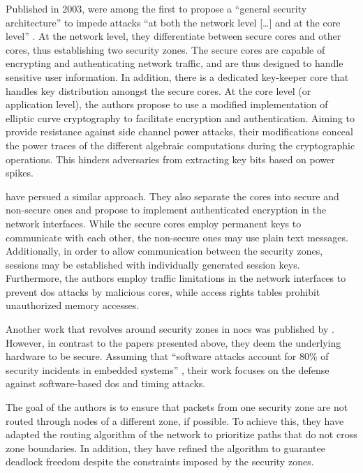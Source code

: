 Published in 2003, \citeauthor{gebotys03securityframework} \cite{gebotys03securityframework} were among the first to propose a \enquote{general security architecture}
\cite[1]{gebotys03securityframework} to impede attacks \enquote{at both the network level […] and at the core level}
\cite[1]{gebotys03securityframework}. At the network level, they differentiate between secure cores and other cores, thus establishing two security
zones. The secure cores are capable of encrypting and authenticating network
traffic, and are thus designed to handle sensitive user information. In addition, there is a dedicated key-keeper core that handles key distribution
amongst the secure cores. At the core level (or application level), the authors propose to use a modified implementation of elliptic curve
cryptography to facilitate encryption and authentication. Aiming to provide resistance against side channel power attacks, their modifications conceal
the power traces of the different algebraic computations during the cryptographic operations. This hinders adversaries from extracting key bits based
on power spikes.

\citeauthor{kapoor13nocauthenc} \cite{kapoor13nocauthenc} have persued a similar approach. They also separate the cores into secure and non-secure
ones and propose to implement authenticated encryption in the network interfaces. While the secure
cores employ permanent keys to communicate with each other, the non-secure ones may use plain text messages. Additionally, in order to allow
communication between the security zones, sessions may be established with individually generated session keys. Furthermore, the authors employ
traffic limitations in the network interfaces to prevent \gls{dos} attacks by malicious cores, while access rights tables prohibit unauthorized
memory accesses.

Another work that revolves around security zones in \glspl{noc} was published by \citeauthor{fernandes16nocrouting} \cite{fernandes16nocrouting}.
However, in contrast to the papers presented above, they deem the underlying hardware to be secure. Assuming that \enquote{software attacks account
for 80\% of security incidents in embedded systems} \cite[1]{fernandes16nocrouting}, their work focuses on the defense against software-based
\gls{dos} and timing attacks.

The goal of the authors is to ensure that packets from one security zone are not routed through nodes of a different zone, if possible. To achieve
this, they have adapted the routing algorithm of the network to prioritize paths that do not cross zone boundaries. In addition, they have
refined the algorithm to guarantee deadlock freedom despite the constraints imposed by the security zones.

